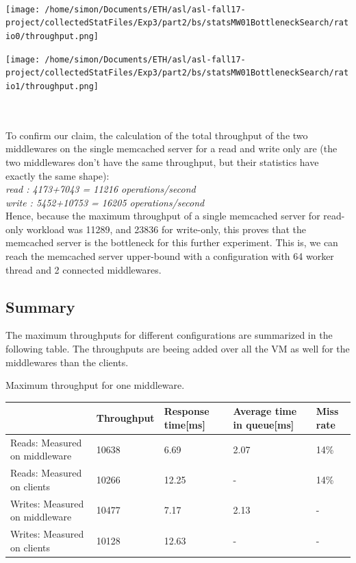 \documentclass[11pt,a4paper]{article}
\begin{document}
\\
\begin{minipage}{0.5\linewidth}
\texttt{[image: /home/simon/Documents/ETH/asl/asl-fall17-project/collectedStatFiles/Exp3/part2/bs/statsMW01BottleneckSearch/ratio0/throughput.png]}
\end{minipage}
\hfill
\begin{minipage}{0.5\linewidth}
\texttt{[image: /home/simon/Documents/ETH/asl/asl-fall17-project/collectedStatFiles/Exp3/part2/bs/statsMW01BottleneckSearch/ratio1/throughput.png]}
\end{minipage}
\\\\
To confirm our claim, the calculation of the total throughput of the two middlewares on the single memcached server for a read and write only are (the two middlewares don't have the same throughput, but their statistics have exactly the same shape):
\\\textit{read : 4173+7043 = 11216 operations/second}
\\\textit{write : 5452+10753 = 16205 operations/second}
\\
Hence, because the maximum throughput of a single memcached server for read-only workload was 11289, and 23836 for write-only, this proves that the memcached server is the bottleneck for this further experiment. This is, we can reach the memcached server upper-bound with a configuration with 64 worker thread and 2 connected middlewares. 



\subsection{Summary}
The maximum throughputs for different configurations are summarized in the following table. The throughputs are beeing added over all the VM as well for the middlewares than the clients. 

\begin{center}
	{Maximum throughput for one middleware.}
	\begin{tabular}{|l|p{2cm}|p{2cm}|p{2cm}|p{2cm}|}
		\hline                                & Throughput & Response time[ms] & Average time in queue[ms] & Miss rate \\ 
		\hline Reads: Measured on middleware  &10638           &6.69              &2.07                       &14\%           \\ 
		\hline Reads: Measured on clients     &10266            &12.25               &-                  &14\%           \\ 
		\hline Writes: Measured on middleware &10477            &7.17               &2.13                       &-      \\ 
		\hline Writes: Measured on clients    &10128            &12.63               &-                  &-       \\ 
		\hline 
	\end{tabular}
\end{center}
\end{document}
